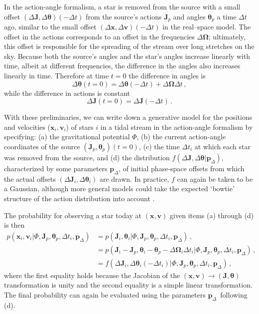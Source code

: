 \documentclass[12pt,preprint]{aastex}
\renewcommand{\vec}[1]{\ensuremath{\mathbf{#1}}}
\newcommand{\vecx}{\ensuremath{\vec{x}}}
\newcommand{\vecv}{\ensuremath{\vec{v}}}
\newcommand{\vecj}{\ensuremath{\vec{J}}}
\newcommand{\veco}{\ensuremath{\vec{\Omega}}}
\newcommand{\veca}{\ensuremath{\boldsymbol\theta}}
\newcommand{\paramsdiff}{\ensuremath{\vec{p}_\Delta}}
\begin{document}
In the action-angle formalism, a star is removed from the source with
a small offset $(\Delta \vecj,\Delta \veca)(-\Delta t)$ from the
source's actions $\vecj_p$ and angles $\veca_p$ a time $\Delta t$ ago,
similar to the small offset $(\Delta \vecx,\Delta \vecv)(-\Delta t)$
in the real--space model. The offset in the actions corresponds to an
offset in the frequencies $\Delta \veco$; ultimately, this offset is
responsible for the spreading of the stream over long stretches on the
sky. Because both the source's angles and the star's angles increase
linearly with time, albeit at different frequencies, the difference in
the angles also increases linearly in time. Therefore at time $t=0$
the difference in angles is
\begin{equation}
\Delta \veca(t=0) = \Delta \veca(-\Delta t) + \Delta \veco \Delta t\,,
\end{equation}
while the difference in actions is constant
\begin{equation}
\Delta \vecj(t=0) = \Delta \vecj(-\Delta t)\,.
\end{equation}

With these preliminaries, we can write down a generative model for the
positions and velocities ($\vecx_i,\vecv_i$) of stars $i$ in a tidal
stream in the action-angle formalism by specifying: (a) the
gravitational potential $\Phi$, (b) the current action-angle
coordinates of the source $(\vecj_p,\veca_p)(t=0)$, (c) the time
$\Delta t_i$ at which each star was removed from the source, and (d)
the distribution $f(\Delta \vecj,\Delta \veca|\paramsdiff)$,
characterized by some parameters $\paramsdiff$, of initial phase-space
offsets from which the actual offsets $(\Delta \vecj_i,\Delta
\veca_i)$ are drawn. In practice, $f$ can again be taken to be a
Gaussian, although more general models could take the expected
`bowtie' structure of the action distribution into account
\citep{Eyre11a}. 

The probability for observing a star today at $(\vecx,\vecv)$ given
items (a) through (d) is then
\begin{align}\label{eq:aadft}
  p(\vecx_i,\vecv_i | \Phi,\vecj_p,\veca_p,\Delta t_i,\paramsdiff) 
  & = p(\vecj_i,\veca_i | \Phi,\vecj_p,\veca_p,\Delta t_i,\paramsdiff) \,,\nonumber\\
  & = p(\vecj_i-\vecj_p,\veca_i-\veca_p-\Delta \veco_i\Delta t_i | \Phi,\vecj_p,\veca_p,\Delta t_i,\paramsdiff) \,,\\
  & = f(\Delta \vecj_i,\Delta \veca_i(-\Delta t_i) | \Phi,\vecj_p,\veca_p,\Delta t_i,\paramsdiff) \,,\nonumber
\end{align}
where the first equality holds because the Jacobian of the
$(\vecx,\vecv)\rightarrow(\vecj,\veca)$ transformation is unity and
the second equality is a simple linear transformation. The final
probability can again be evaluated using the parameters
\paramsdiff\ following (d).
\end{document}
